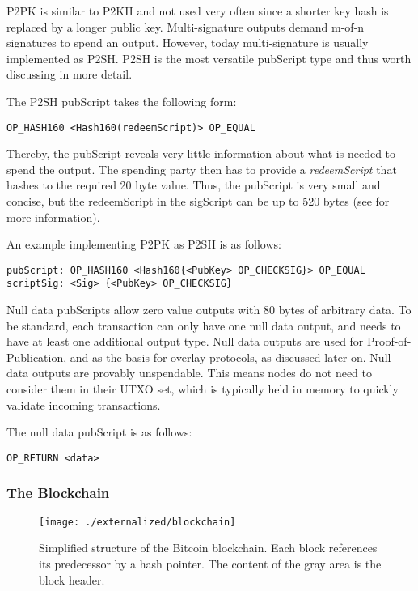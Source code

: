 P2PK is similar to P2KH and not used very often since a shorter key hash is replaced by a longer public key. Multi-signature outputs demand m-of-n signatures to spend an output. However, today multi-signature is usually implemented as P2SH. P2SH is the most versatile pubScript type and thus worth discussing in more detail.

The P2SH pubScript takes the following form:

\begin{lstlisting}
OP_HASH160 <Hash160(redeemScript)> OP_EQUAL
\end{lstlisting}

Thereby, the pubScript reveals very little information about what is needed to spend the output. The spending party then has to provide a \emph{redeemScript} that hashes to the required 20 byte value. Thus, the pubScript is very small and concise, but the redeemScript in the sigScript can be up to 520 bytes (see \cite{bip16} for more information). 

An example implementing P2PK as P2SH is as follows:

\begin{lstlisting}[breaklines]
pubScript: OP_HASH160 <Hash160{<PubKey> OP_CHECKSIG}> OP_EQUAL
scriptSig: <Sig> {<PubKey> OP_CHECKSIG}
\end{lstlisting}

Null data pubScripts allow zero value outputs with 80 bytes of arbitrary data. To be standard, each transaction can only have one null data output, and needs to have at least one additional output type. Null data outputs are used for Proof-of-Publication, and as the basis for overlay protocols, as discussed later on. Null data outputs are provably unspendable. This means nodes do not need to consider them in their UTXO set, which is typically held in memory to quickly validate incoming transactions. 

The null data pubScript is as follows:
\begin{lstlisting}
OP_RETURN <data>
\end{lstlisting}

\subsubsection{The Blockchain}
\label{sec:blockchain}

 \begin{figure*}[!t]
    \centering
    \texttt{[image: ./externalized/blockchain]}
    \caption{Simplified structure of the Bitcoin blockchain. Each block references its predecessor by a hash pointer. The content of the gray area is the block header.}
    \label{fig:blockchain}
  \end{figure*}


